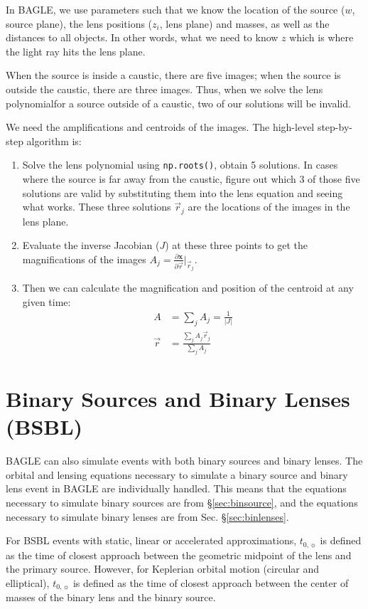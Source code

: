 \documentclass[twocolumn]{aastex701}
\newcommand{\vect}[1]{\boldsymbol{#1}}
\newcommand{\tnot}{t_{0,\sun}}
\begin{document}
In BAGLE, we use parameters such that we know the location of the source ($w$, source plane), the lens positions ($z_i$, lens plane) and masses, as well as the distances to all objects.
In other words, what we need to know $z$ which is where the light ray hits the lens plane.

When the source is inside a caustic, there are five images; when the source is outside the caustic, there are three images. Thus, when we solve the lens polynomialfor a source outside of a caustic, two of our solutions will be invalid.

We need the amplifications and centroids of the images. The high-level step-by-step algorithm is:

\begin{enumerate}
    \item Solve the lens polynomial using \texttt{np.roots()}, obtain 5 solutions. In cases where the source is far away from the caustic, figure out which 3 of those five solutions are valid by substituting them into the lens equation and seeing what works. These three solutions $\vec{r}_j$ are the locations of the images in the lens plane.
    \item Evaluate the inverse Jacobian ($J$) at these three points to get the magnifications of the images $A_j = \frac{\partial \vect{x}}{ \partial \vec{r}} |_{\vec{r}_j}$. 
    \item Then we can calculate the magnification and position of the centroid at any given time: 
    \begin{align}
        A &= \sum_j A_j  = \frac{1}{|J|}\\
        \vec{r} &= \frac{\sum_j A_j \vec{r}_j}{\sum_j A_j}
    \end{align}
\end{enumerate}


\section{Binary Sources and Binary Lenses (BSBL) \label{sec:bineverything}}
 
 BAGLE can also simulate events with both binary sources and binary lenses. The orbital and lensing equations necessary to simulate a binary source and binary lens event in BAGLE are individually handled. This means that the equations necessary to simulate binary sources are from \S\ref{sec:binsource}, and the equations necessary to simulate binary lenses are from Sec. \S\ref{sec:binlenses}.

For BSBL events with static, linear or accelerated approximations, $\tnot$ is defined as the time of closest approach between the geometric midpoint of the lens and the primary source. However, for Keplerian orbital motion (circular and elliptical), $\tnot$ is defined as the time of closest approach between the center of masses of the binary lens and the binary source. 
\end{document}
